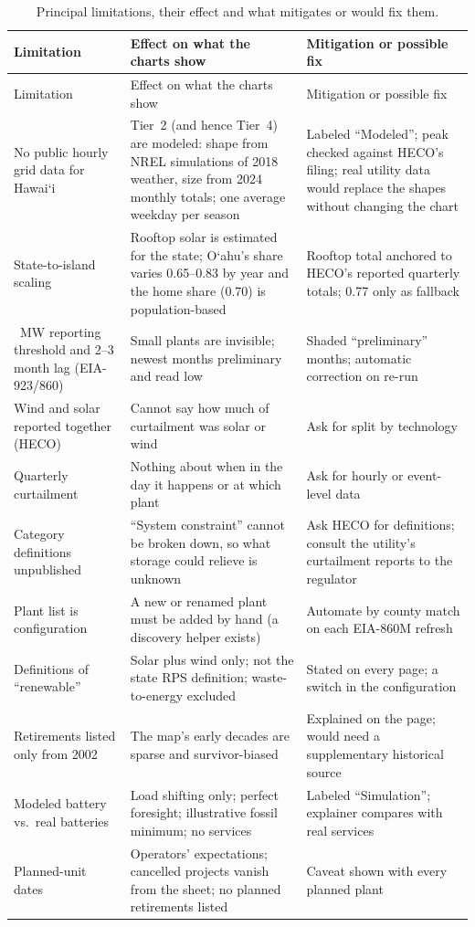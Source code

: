 \documentclass[11pt,a4paper]{article}
\newcommand{\okina}{\textquoteleft}
\newcommand{\Oahu}{\texorpdfstring{O\okina ahu}{Oahu}}
\newcommand{\Hawaii}{\texorpdfstring{Hawai\okina i}{Hawaii}}
\begin{document}
{\footnotesize\setlength{\tabcolsep}{4pt}
\begin{longtable}{@{}>{\raggedright\arraybackslash}p{3.4cm}>{\raggedright\arraybackslash}p{5.9cm}>{\raggedright\arraybackslash}p{6.0cm}@{}}
\caption{Principal limitations, their effect and what mitigates or would fix them.}\\
\toprule
Limitation & Effect on what the charts show & Mitigation or possible fix \\
\midrule
\endfirsthead
\toprule
Limitation & Effect on what the charts show & Mitigation or possible fix \\
\midrule
\endhead
\bottomrule
\endfoot
\bottomrule
\endlastfoot
No public hourly grid data for \Hawaii & Tier~2 (and hence Tier~4) are modeled: shape from NREL simulations of 2018 weather, size from 2024 monthly totals; one average weekday per season & Labeled ``Modeled''; peak checked against HECO's filing; real utility data would replace the shapes without changing the chart \\
State-to-island scaling & Rooftop solar is estimated for the state; \Oahu's share varies 0.65--0.83 by year and the home share (0.70) is population-based & Rooftop total anchored to HECO's reported quarterly totals; 0.77 only as fallback \\
1~MW reporting threshold and 2--3 month lag (EIA-923/860) & Small plants are invisible; newest months preliminary and read low & Shaded ``preliminary'' months; automatic correction on re-run \\
Wind and solar reported together (HECO) & Cannot say how much of curtailment was solar or wind & Ask for split by technology \\
Quarterly curtailment & Nothing about when in the day it happens or at which plant & Ask for hourly or event-level data \\
Category definitions unpublished & ``System constraint'' cannot be broken down, so what storage could relieve is unknown & Ask HECO for definitions; consult the utility's curtailment reports to the regulator \\
Plant list is configuration & A new or renamed plant must be added by hand (a discovery helper exists) & Automate by county match on each EIA-860M refresh \\
Definitions of ``renewable'' & Solar plus wind only; not the state RPS definition; waste-to-energy excluded & Stated on every page; a switch in the configuration \\
Retirements listed only from 2002 & The map's early decades are sparse and survivor-biased & Explained on the page; would need a supplementary historical source \\
Modeled battery vs.\ real batteries & Load shifting only; perfect foresight; illustrative fossil minimum; no services & Labeled ``Simulation''; explainer compares with real services \\
Planned-unit dates & Operators' expectations; cancelled projects vanish from the sheet; no planned retirements listed & Caveat shown with every planned plant \\
\end{longtable}}
\end{document}
